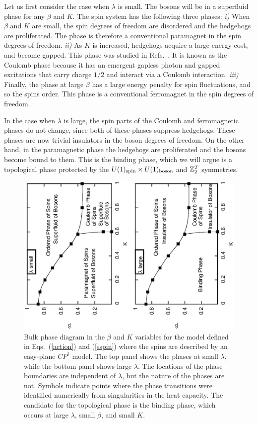 Let us first consider the case when $\lambda$ is small. The bosons will be in a superfluid phase for any $\beta$ and $K$. The spin system has the following three phases: 
{\it i)} When $\beta$ and $K$ are small, the spin degrees of freedom are disordered and the hedgehogs are proliferated. The phase is therefore a conventional paramagnet in the spin degrees of freedom. 
{\it ii)} As $K$ is increased, hedgehogs acquire a large energy cost, and become gapped. This phase was studied in Refs.~\cite{LesikSenthil, LesikAshvin, artphoton}. It is known as the Coulomb phase\cite{HermeleFisherBalents} because it has an emergent gapless photon and gapped excitations that carry charge $1/2$ and interact via a Coulomb interaction. 
{\it iii)} Finally, the phase at large $\beta$ has a large energy penalty for spin fluctuations, and so the spins order. This phase is a conventional ferromagnet in the spin degrees of freedom. 

In the case when $\lambda$ is large, the spin parts of the Coulomb and ferromagnetic phases do not change, since both of these phases suppress hedgehogs. These phases are now trivial insulators in the boson degrees of freedom. On the other hand, in the paramagnetic phase the hedgehogs are proliferated and the bosons become bound to them. This is the binding phase, which we will argue is a topological phase protected by the $U(1)_{\rm spin}\times U(1)_{\rm boson}$ and $\mathbb{Z}_2^T$ symmetries.



\begin{figure}
\includegraphics[angle=-90,width=\linewidth]{figures/cp1bulkphase.eps}
\caption{Bulk phase diagram in the $\beta$ and $K$ variables for the model defined in Eqs.~(\ref{action}) and (\ref{sspin}) where the spins are described by an easy-plane $CP^1$ model. The top panel shows the phases at small $\lambda$, while the bottom panel shows large $\lambda$. The locations of the phase boundaries are independent of $\lambda$, but the nature of the phases are not. Symbols indicate points where the phase transitions were identified numerically from singularities in the heat capacity. The candidate for the topological phase is the binding phase, which occurs at large $\lambda$, small $\beta$, and small $K$. }
\label{cp1bulkphase}
\end{figure}
 


